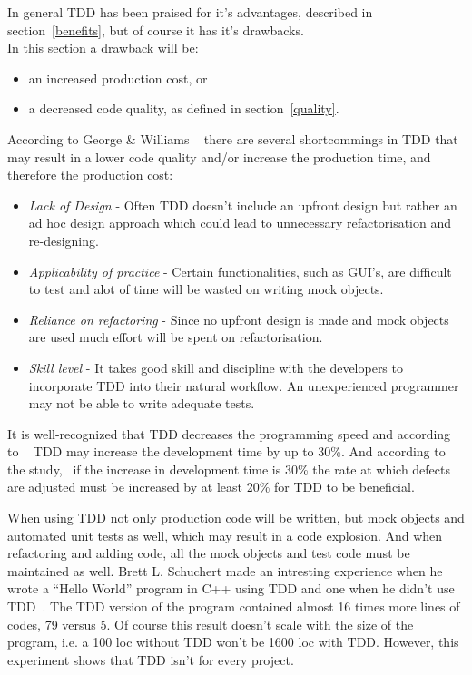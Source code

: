 In general TDD has been praised for it's advantages, described in section~\ref{benefits}, but of course it has it's drawbacks.\\

\noindent In this section a drawback will be:
\begin{itemize}
\item an increased production cost, or
\item a decreased code quality, as defined in section~\ref{quality}.
\end{itemize}

According to George \& Williams ~\cite{georgeandwilliams} there are several shortcommings in TDD that may result in a lower code quality and/or increase the production time, and therefore the production cost:
\begin{itemize}
 \item \textit{Lack of Design} - Often TDD doesn't include an upfront design but rather an ad hoc design approach which could lead to unnecessary refactorisation and re-designing. 
 \item \textit{Applicability of practice} - Certain functionalities, such as GUI's, are difficult to test and alot of time will be wasted on writing mock objects.
 \item \textit{Reliance on refactoring} - Since no upfront design is made and mock objects are used much effort will be spent on refactorisation.
 \item \textit{Skill level} - It takes good skill and discipline with the developers to incorporate TDD into their natural workflow. An unexperienced programmer may not be able to write adequate tests.\\
\end{itemize}

\noindent It is well-recognized that TDD decreases the programming speed and according to ~\cite{microsoftibm} TDD may increase the development time by up to 30\%. 
And according to the study,~\cite{tddroi} if the increase in development time is 30\% the rate at which defects are adjusted must be increased by at least 20\% for TDD to be beneficial.

When using TDD not only production code will be written, but mock objects and automated unit tests as well, which may result in a code explosion. And when refactoring and adding code, all the mock objects and test code must be maintained as well. Brett L. Schuchert made an intresting experience when he wrote a ``Hello World'' program in C++ using TDD and one when he didn't use TDD~\cite{helloworld}. 
The TDD version of the program contained almost 16 times more lines of codes, 79 versus 5. Of course this result doesn't scale with the size of the program, i.e. a 100 loc without TDD won't be 1600 loc with TDD. However, this experiment shows that TDD isn't for every project.
